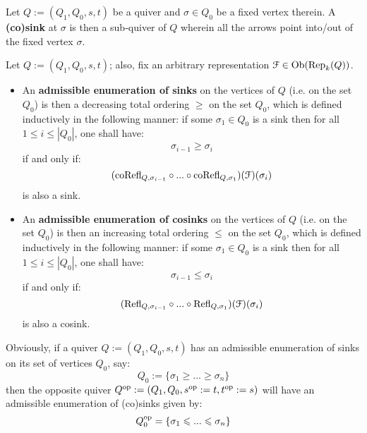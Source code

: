             \begin{definition}[(Co)sinks] \label{def: (co)sinks}
                Let $Q := (Q_1, Q_0, s, t)$ be a quiver and $\sigma \in Q_0$ be a fixed vertex therein. A \textbf{(co)sink} at $\sigma$ is then a sub-quiver of $Q$ wherein all the arrows point into/out of the fixed vertex $\sigma$. 
            \end{definition}
            \begin{convention}
                
            \end{convention}
            \begin{definition} \label{def: admissible_enumerations_of_(co)sinks}
                Let $Q := (Q_1, Q_0, s, t)$; also, fix an arbitrary representation $\mathcal{F} \in \mathrm{Ob}(\mathrm{Rep}_k(Q))$. 
                    \begin{itemize}
                        \item An \textbf{admissible enumeration of sinks} on the vertices of $Q$ (i.e. on the set $Q_0$) is then a decreasing total ordering $\geq$ on the set $Q_0$, which is defined inductively in the following manner: if some $\sigma_1 \in Q_0$ is a sink then for all $1 \leq i \leq |Q_0|$, one shall have:
                            $$\sigma_{i - 1} \geq \sigma_i$$
                        if and only if:
                            $$(\mathrm{co}\mathrm{Refl}_{Q, \sigma_{i - 1}} \circ ... \circ \mathrm{co}\mathrm{Refl}_{Q, \sigma_1})(\mathcal{F})(\sigma_i)$$
                        is also a sink.
                        \item An \textbf{admissible enumeration of cosinks} on the vertices of $Q$ (i.e. on the set $Q_0$) is then an increasing total ordering $\leq$ on the set $Q_0$, which is defined inductively in the following manner: if some $\sigma_1 \in Q_0$ is a sink then for all $1 \leq i \leq |Q_0|$, one shall have:
                            $$\sigma_{i - 1} \leq \sigma_i$$
                        if and only if:
                            $$(\mathrm{Refl}_{Q, \sigma_{i - 1}} \circ ... \circ \mathrm{Refl}_{Q, \sigma_1})(\mathcal{F})(\sigma_i)$$
                        is also a cosink.
                    \end{itemize}
            \end{definition}
            \begin{remark}
                Obviously, if a quiver $Q := (Q_1, Q_0, s, t)$ has an admissible enumeration of sinks on its set of vertices $Q_0$, say:
                    $$Q_0 := \{\sigma_1 \geq ... \geq \sigma_n\}$$
                then the opposite quiver $Q^{\mathrm{op}} := (Q_1, Q_0, s^{\mathrm{op}} := t, t^{\mathrm{op}} := s)$ will have an admissible enumeration of (co)sinks given by:
                    $$Q^{\mathrm{op}}_0 = \{\sigma_1 \leqslant ... \leqslant \sigma_n\}$$
            \end{remark}
